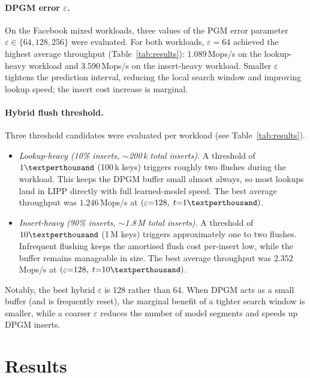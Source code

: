 \documentclass{MITcsail}
\newcommand{\permil}{\textperthousand}
\begin{document}
\paragraph{DPGM error $\varepsilon$.}
On the Facebook mixed workloads, three values of the PGM error parameter
$\varepsilon \in \{64, 128, 256\}$ were evaluated.  For both workloads,
$\varepsilon{=}64$ achieved the highest average throughput
(Table~\ref{tab:results}):
$1.089$\,Mops/s on the lookup-heavy workload and $3.590$\,Mops/s on the
insert-heavy workload.  Smaller $\varepsilon$ tightens the prediction interval,
reducing the local search window and improving lookup speed; the insert cost
increase is marginal.

\paragraph{Hybrid flush threshold.}
Three threshold candidates were evaluated per workload (see
Table~\ref{tab:results}).

\begin{itemize}
  \item \emph{Lookup-heavy (10\% inserts, $\sim$200\,k total inserts).}
    A threshold of $1\permil$ (100\,k keys) triggers roughly two flushes
    during the workload.  This keeps the DPGM buffer small almost always,
    so most lookups land in LIPP directly with full learned-model speed.
    The best average throughput was $1.246$\,Mops/s at
    $(\varepsilon{=}128,\; t{=}1\permil)$.

  \item \emph{Insert-heavy (90\% inserts, $\sim$1.8\,M total inserts).}
    A threshold of $10\permil$ (1\,M keys) triggers approximately one to
    two flushes.  Infrequent flushing keeps the amortised flush cost
    per-insert low, while the buffer remains manageable in size.
    The best average throughput was $2.352$\,Mops/s at
    $(\varepsilon{=}128,\; t{=}10\permil)$.
\end{itemize}

Notably, the best hybrid $\varepsilon$ is 128 rather than 64.  When DPGM
acts as a small buffer (and is frequently reset), the marginal benefit of a
tighter search window is smaller, while a coarser $\varepsilon$ reduces the
number of model segments and speeds up DPGM inserts.

\section{Results}
\end{document}
